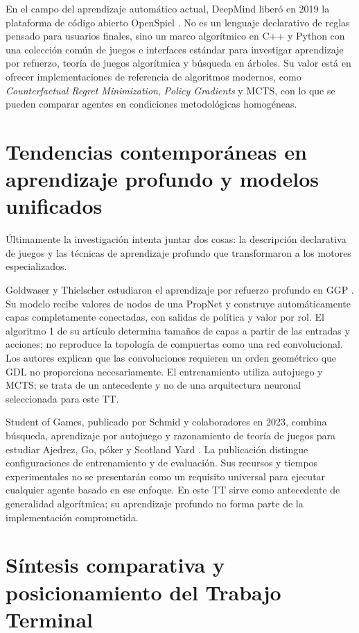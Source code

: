 En el campo del aprendizaje automático actual, DeepMind liberó en 2019 la plataforma de código abierto OpenSpiel \cite{Lanctot2019OpenSpiel}. No es un lenguaje declarativo de reglas pensado para usuarios finales, sino un marco algorítmico en C++ y Python con una colección común de juegos e interfaces estándar para investigar aprendizaje por refuerzo, teoría de juegos algorítmica y búsqueda en árboles. Su valor está en ofrecer implementaciones de referencia de algoritmos modernos, como \textit{Counterfactual Regret Minimization}, \textit{Policy Gradients} y MCTS, con lo que se pueden comparar agentes en condiciones metodológicas homogéneas.

\section{Tendencias contemporáneas en aprendizaje profundo y modelos unificados}

Últimamente la investigación intenta juntar dos cosas: la descripción declarativa de juegos y las técnicas de aprendizaje profundo que transformaron a los motores especializados.

Goldwaser y Thielscher estudiaron el aprendizaje por refuerzo profundo en GGP \cite{Goldwaser2020DRLGGP}. Su modelo recibe valores de nodos de una PropNet y construye automáticamente capas completamente conectadas, con salidas de política y valor por rol. El algoritmo 1 de su artículo determina tamaños de capas a partir de las entradas y acciones; no reproduce la topología de compuertas como una red convolucional. Los autores explican que las convoluciones requieren un orden geométrico que GDL no proporciona necesariamente. El entrenamiento utiliza autojuego y MCTS; se trata de un antecedente y no de una arquitectura neuronal seleccionada para este TT.

Student of Games, publicado por Schmid y colaboradores en 2023, combina búsqueda, aprendizaje por autojuego y razonamiento de teoría de juegos para estudiar Ajedrez, Go, póker y Scotland Yard \cite{Schmid2023StudentOfGames}. La publicación distingue configuraciones de entrenamiento y de evaluación. Sus recursos y tiempos experimentales no se presentarán como un requisito universal para ejecutar cualquier agente basado en ese enfoque. En este TT sirve como antecedente de generalidad algorítmica; su aprendizaje profundo no forma parte de la implementación comprometida.

\section{Síntesis comparativa y posicionamiento del Trabajo Terminal}

